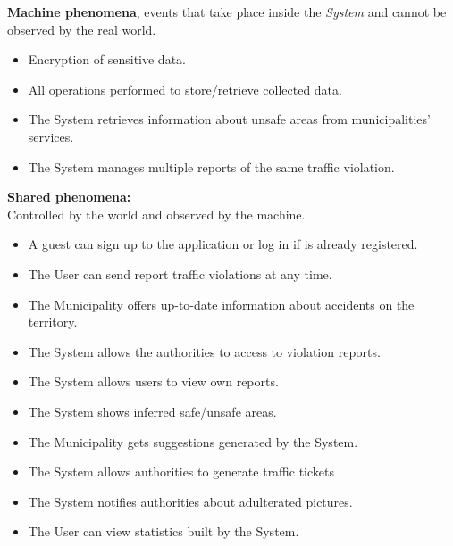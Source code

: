     \noindent\textbf{Machine phenomena}, events that take place inside the \textit{System} and cannot be observed by the real world.
    \begin{itemize}
      \item Encryption of sensitive data.
      \item All operations performed to store/retrieve collected data.
      \item The System retrieves information about unsafe areas from municipalities' services.
      \item The System manages multiple reports of the same traffic violation.
    \end{itemize}
    \vspace{0.5cm}
    
    \noindent\textbf{Shared phenomena:}\\\newline
    Controlled by the world and observed by the machine.
    \begin{itemize}
      \item A guest can sign up to the application or log in if is already registered.
      \item The User can send report traffic violations at any time.
      \item The Municipality offers up-to-date information about accidents on the territory.
    \end{itemize}
    
    \begin{itemize}
      \item The System allows the authorities to access to violation reports.
      \item The System allows users to view own reports.
      \item The System shows inferred safe/unsafe areas.
      \item The Municipality gets suggestions generated by the System.
      \item The System allows authorities to generate traffic tickets
      \item The System notifies authorities about adulterated pictures. 
      \item The User can view  statistics built by the System.
    \end{itemize}

